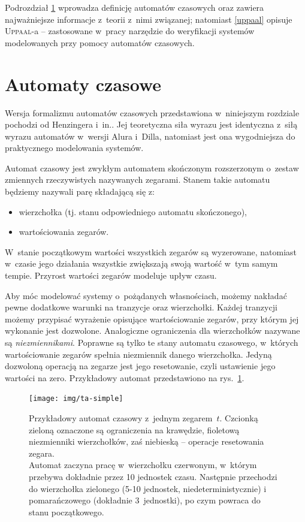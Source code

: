 \documentclass{pracamgr}
\newcommand{\imgr}[1]{rys.~\ref{#1}}
\newcommand{\upp}{\textsc{Uppaal}}
\theoremstyle{plain}
\begin{document}
Podrozdział \ref{ta-theory} wprowadza definicję automatów czasowych
oraz zawiera najważniejsze informacje z~teorii z~nimi związanej;
natomiast \ref{uppaal} opisuje \upp-a -- zastosowane w~pracy narzędzie
do weryfikacji systemów modelowanych przy pomocy automatów czasowych.

\section{Automaty czasowe}
\label{ta-theory}

Wersja formalizmu automatów czasowych przedstawiona w~niniejszym
rozdziale pochodzi od Henzingera i~in.\cite{henz-94}. Jej teoretyczna
siła wyrazu jest identyczna z~siłą wyrazu automatów w~wersji Alura
i~Dilla, natomiast jest ona wygodniejsza do praktycznego modelowania
systemów.

Automat czasowy jest zwykłym automatem skończonym rozszerzonym
o~zestaw zmiennych rzeczywistych nazywanych zegarami. Stanem takie
automatu będziemy nazywali parę składającą się z:
\begin{itemize}
  \item wierzchołka (tj. stanu odpowiedniego automatu skończonego),
  \item wartościowania zegarów.
\end{itemize}
W~stanie początkowym wartości wszystkich zegarów są wyzerowane,
natomiast w~czasie jego działania wszystkie zwiększają swoją wartość
w~tym samym tempie. Przyrost wartości zegarów modeluje upływ czasu.

Aby móc modelować systemy o~pożądanych własnościach, możemy nakładać
pewne dodatkowe warunki na tranzycje oraz wierzchołki. Każdej
tranzycji możemy przypisać wyrażenie opisujące wartościowanie zegarów,
przy którym jej wykonanie jest dozwolone. Analogiczne ograniczenia dla
wierzchołków nazywane są \emph{niezmiennikami}. Poprawne są tylko te
stany automatu czasowego, w~których wartościowanie zegarów spełnia
niezmiennik danego wierzchołka. Jedyną dozwoloną operacją na zegarze
jest jego resetowanie, czyli ustawienie jego wartości na
zero. Przykładowy automat przedstawiono na \imgr{img:ta-simple}.

\begin{figure}
  \centering
  \texttt{[image: img/ta-simple]}
  \caption {Przykładowy automat czasowy z~jednym zegarem~$t$.
    Czcionką zieloną oznaczone są ograniczenia na krawędzie, fioletową
    niezmienniki wierzchołków, zaś niebieską -- operacje resetowania
    zegara.\\ Automat zaczyna pracę w~wierzchołku czerwonym, w~którym
    przebywa dokładnie przez 10 jednostek czasu. Następnie przechodzi
    do wierzchołka zielonego (5-10 jednostek, niedeterministycznie)
i~    pomarańczowego (dokładnie 3~jednostki), po czym powraca do stanu
    początkowego.}
  \label{img:ta-simple}
\end{figure}
\end{document}
